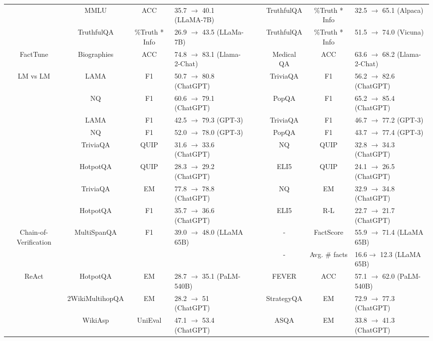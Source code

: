\begin{table}[t]
\begin{adjustbox}{max width=\textwidth}
{\begin{tabular}{ccclc|c|ccl}
& MMLU& ACC  & 35.7 $\rightarrow$ 40.1 (LLaMA-7B) &&& TruthfulQA & \%Truth * Info & 32.5 $\rightarrow$ 65.1 (Alpaca) \\
&  TruthfulQA & \%Truth * Info & 26.9 $\rightarrow$ 43.5 (LLaMa-7B) &&&  TruthfulQA & \%Truth * Info & 51.5 $\rightarrow$ 74.0 (Vicuna) \\
\midrule
FactTune \citep{ovadia2023finetuning} & Biographies  & ACC & 74.8 $\rightarrow$ 83.1 (Llama-2-Chat) &&& Medical QA & ACC & 63.6 $\rightarrow$ 68.2 (Llama-2-Chat)  \\
\midrule
LM vs LM \citep{cohen2023lm} & LAMA & F1 & 50.7 $\rightarrow$ 80.8 (ChatGPT) &&& TriviaQA & F1 & 56.2 $\rightarrow$ 82.6 (ChatGPT) \\
& NQ & F1 & 60.6 $\rightarrow$ 79.1 (ChatGPT) &&& PopQA & F1 & 65.2 $\rightarrow$ 85.4 (ChatGPT) \\
& LAMA & F1 & 42.5 $\rightarrow$ 79.3 (GPT-3) &&& TriviaQA & F1 & 46.7 $\rightarrow$ 77.2 (GPT-3) \\
& NQ & F1 & 52.0 $\rightarrow$ 78.0 (GPT-3) &&& PopQA & F1 & 43.7 $\rightarrow$ 77.4 (GPT-3) \\
\midrule
\citet{weller2023according} & TriviaQA & QUIP & 31.6 $\rightarrow$ 33.6 (ChatGPT) &&& NQ & QUIP & 32.8 $\rightarrow$ 34.3 (ChatGPT) \\
& HotpotQA & QUIP & 28.3 $\rightarrow$ 29.2 (ChatGPT) &&& ELI5  & QUIP & 24.1 $\rightarrow$ 26.5 (ChatGPT) \\
& TriviaQA & EM & 77.8 $\rightarrow$ 78.8 (ChatGPT) &&& NQ & EM & 32.9 $\rightarrow$ 34.8 (ChatGPT) \\
& HotpotQA & F1 & 35.7 $\rightarrow$ 36.6 (ChatGPT) &&& ELI5  & R-L & 22.7 $\rightarrow$ 21.7 (ChatGPT) \\
\midrule
Chain-of-Verification \citep{dhuliawala2023chain} & MultiSpanQA & F1 & 39.0 $\rightarrow$ 48.0 (LLaMA 65B) &&& - & FactScore & 55.9 $\rightarrow$ 71.4 (LLaMA 65B) \\
&&&&&& - & Avg. \# facts & 16.6$\rightarrow$ 12.3  (LLaMA 65B)  \\
\midrule
ReAct \citep{yao2023react} & HotpotQA & EM & 28.7 $\rightarrow$ 35.1 (PaLM-540B) &&& FEVER & ACC & 57.1 $\rightarrow$ 62.0 (PaLM-540B)\\
\midrule
\citet{jiang2023active} & 2WikiMultihopQA & EM & 28.2 $\rightarrow$ 51 (ChatGPT) &&& StrategyQA & EM & 72.9 $\rightarrow$ 77.3 (ChatGPT) \\
& WikiAsp & UniEval & 47.1 $\rightarrow$ 53.4 (ChatGPT) &&& ASQA & EM & 33.8 $\rightarrow$ 41.3 (ChatGPT) \\

\end{tabular}}
\end{adjustbox}
\end{table}
